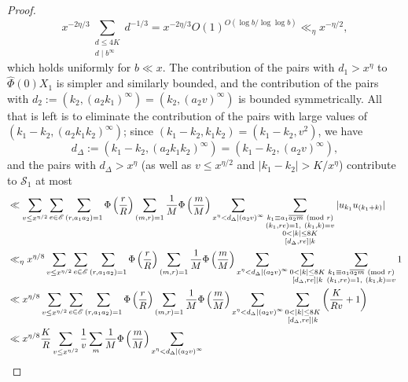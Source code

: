 \documentclass[reqno,11pt]{amsart}
\theoremstyle{definition}
\theoremstyle{remark}
\numberwithin{equation}{section}
\newcommand{\msE}{\mathscr{E}}
\newcommand{\mS}{\mathcal{S}}
\renewcommand{\bar}{\overline}
\renewcommand{\hat}{\widehat}
\renewcommand{\pmod}[1]{\ (\textnormal{mod } #1)}
\begin{document}
\begin{proof}
\begin{equation}
    x^{-2\eta/3} \sum_{\substack{d \le 4K \\ d \mid b^\infty }} d^{-1/3}
    =
    x^{-2\eta/3} O(1)^{O(\log b / \log \log b)}
    \ll_\eta 
    x^{-\eta/2},
\end{equation}
which holds uniformly for $b \ll x$. The contribution of the pairs with $d_1 > x^\eta$ to $\hat{\Phi}(0)X_1$ is simpler and similarly bounded, and the contribution of the pairs with $d_2 := (k_2, (a_2k_1)^\infty) = (k_2, (a_2v)^\infty)$ is bounded symmetrically. All that is left is to eliminate the contribution of the pairs with large values of $(k_1 - k_2, (a_2k_1k_2)^\infty)$; since $(k_1 - k_2, k_1k_2) = (k_1 - k_2, v^2)$, we have
\[
    d_\Delta := (k_1 - k_2, (a_2k_1k_2)^\infty)
    =
    (k_1 - k_2, (a_2v)^\infty),
\]
and the pairs with $d_\Delta > x^\eta$ (as well as $v \le x^{\eta/2}$ and $|k_1 - k_2| > K/x^\eta$) contribute to $\mS_1$ at most
\[
\begin{aligned}
    &\ll 
    \sum_{v \le x^{\eta/2}}
    \sum_{e \in \msE} \sum_{(r,a_1a_2)=1} \Phi\left(\frac{r}{R}\right) \sum_{(m,r)=1} \frac{1}{M} \Phi\left(\frac{m}{M}\right)
    \sum_{\substack{x^\eta < d_\Delta \mid (a_2v)^\infty}} 
    \sum_{\substack{k_1 \equiv a_1 \bar{a_2m} \pmod{r} \\ (k_1, re) = 1,\ (k_1, k) = v \\ 0 < |k| \le 8K \\ [d_\Delta, re] \mid k}} |u_{k_1}u_{(k_1+k)}|
    \\
    &\ll_\eta x^{\eta/8}
    \sum_{v \le x^{\eta/2}}
    \sum_{e \in \msE} \sum_{(r,a_1a_2)=1} \Phi\left(\frac{r}{R}\right) \sum_{(m,r)=1} \frac{1}{M} \Phi\left(\frac{m}{M}\right)
    \sum_{\substack{x^\eta < d_\Delta \mid (a_2v)^\infty}} 
    \sum_{\substack{0 < |k| \le 8K \\ [d_\Delta, re] \mid k}} \sum_{\substack{k_1 \equiv a_1 \bar{a_2m} \pmod{r} \\ (k_1, re) = 1,\ (k_1, k) = v}} 1
    \\
    &\ll 
    x^{\eta/8}
    \sum_{v \le x^{\eta/2}}
    \sum_{e \in \msE} \sum_{(r,a_1a_2)=1} \Phi\left(\frac{r}{R}\right) \sum_{(m,r)=1} \frac{1}{M} \Phi\left(\frac{m}{M}\right)
    \sum_{\substack{x^\eta < d_\Delta \mid (a_2v)^\infty}} 
    \sum_{\substack{0 < |k| \le 8K \\ [d_\Delta, re] \mid k}} \left(\frac{K}{Rv} + 1\right)
    \\
    &\ll 
    x^{\eta/8} \frac{K}{R}
    \sum_{v \le x^{\eta/2}} \frac{1}{v}
    \sum_{m} \frac{1}{M} \Phi\left(\frac{m}{M}\right)
    \sum_{\substack{x^\eta < d_\Delta \mid (a_2v)^\infty}} 

\end{aligned}\]
\end{proof}
\end{document}
